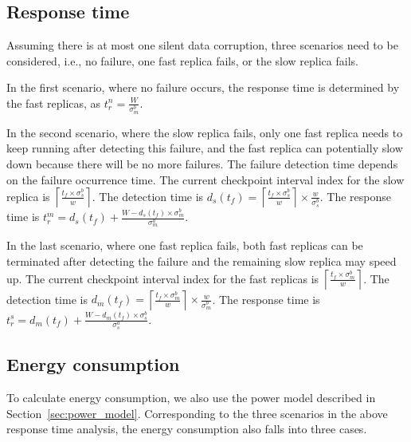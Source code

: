 \subsection{Response time}
Assuming there is at most one silent data corruption, three scenarios need to be considered, i.e., no failure, one fast replica fails, or the slow replica  fails.

In the first scenario, where no failure occurs, the response time is determined by the fast replicas, as $t_r^n=\frac{W}{\sigma_{m}^b}$.

In the second scenario, 
where the slow replica fails, only one fast replica needs to keep running after detecting this failure, and the fast replica can potentially slow down because there will be no more failures.
The failure detection time depends on the failure occurrence time. The current checkpoint interval index for the slow replica is $\left \lceil{\frac{t_f \times \sigma_s^b}{w}}\right \rceil$. The detection time is $d_s(t_f) = \left \lceil{\frac{t_f \times \sigma_s^b}{w}}\right \rceil \times \frac{w}{\sigma_s^b}$. The response time is $t_r^m = d_s(t_f) + \frac{W - d_s(t_f)\times \sigma_m^b}{\sigma_m^a}$. 

In the last scenario, where one fast replica fails, both fast replicas can be terminated after detecting the failure and the remaining slow replica may speed up. The current checkpoint interval index for the fast replicas is $\left \lceil{\frac{t_f \times \sigma_m^b}{w}}\right \rceil$. The detection time is $d_m(t_f) = \left \lceil{\frac{t_f \times \sigma_m^b}{w}}\right \rceil \times \frac{w}{\sigma_m^b}$. The response time is $t_r^s = d_m(t_f) + \frac{W - d_m(t_f)\times \sigma_s^b}{\sigma_s^a}$. 



\subsection{Energy consumption}
To calculate energy consumption, we also use the power model described in Section~\ref{sec:power_model}.
Corresponding to the three scenarios in the above response time analysis, the energy consumption also falls into three cases. 

